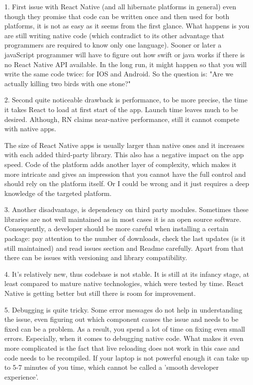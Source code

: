 1. First issue with React Native (and all hibernate platforms in general) even though they promise that code can be written once and then used for both platforms, it is not as easy as it seems from the first glance. What happens is you are still writing native code (which contradict to its other advantage that programmers are required to know only one language). Sooner or later a javaScript programmer will have to figure out how swift or java works if there is no React Native API available. In the long run, it might happen so that you will write the same code twice: for IOS and Android. So the question is: "Are we actually killing two birds with one stone?"

2. Second quite noticeable drawback is performance, to be more precise, the time it takes React to load at first start of the app. Launch time leaves much to be desired.
Although, RN claims near-native performance, still it cannot compete with native apps.

The size of React Native apps is usually larger than native ones and it increases with each added third-party library. This also has a negative impact on the app speed.
Code of the platform adds another layer of complexity, which makes it more intricate and gives an impression that you cannot have the full control and should rely on the platform itself.
Or I could be wrong and it just requires a deep knowledge of the targeted platform.

3. Another disadvantage, is dependency on third party modules.
Sometimes these libraries are not well maintained as in most cases it is an open source software. Consequently, a developer should be more careful when installing a certain package: pay attention to the number of downloads, check the last updates (is it still maintained) and read issues section and Readme carefully. 
Apart from that there can be issues with versioning and library compatibility. 

4. It’s relatively new, thus codebase is not stable. It is still at its infancy stage, at least compared to mature native technologies, which were tested by time. React Native is getting better but still there is room for improvement.

5. Debugging is quite tricky. Some error messages do not help in understanding the issue, even figuring out which component causes the issue and needs to be fixed can be a problem.
As a result, you spend a lot of time on fixing even small errors. Especially, when it comes to debugging native code. What makes it even more complicated is the fact that live reloading does not work in this case and code needs to be recompiled. If your laptop is not powerful enough it can take up to 5-7 minutes of you time, which cannot be called a 'smooth developer experience'.

